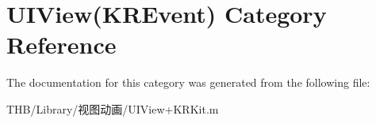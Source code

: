 \hypertarget{category_u_i_view_07_k_r_event_08}{}\section{U\+I\+View(K\+R\+Event) Category Reference}
\label{category_u_i_view_07_k_r_event_08}


The documentation for this category was generated from the following file\+:\begin{DoxyCompactItemize}
\item 
T\+H\+B/\+Library/视图动画/U\+I\+View+\+K\+R\+Kit.\+m\end{DoxyCompactItemize}
